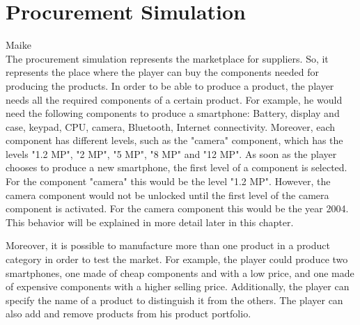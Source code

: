 \section{Procurement Simulation}
\label{procuresim}
Maike\\

The procurement simulation represents the marketplace for suppliers. So, it represents the place where the player can buy the components needed for producing the products. In order to be able to produce a product, the player needs all the required components of a certain product. For example, he would need the following components to produce a smartphone: Battery, display and case, keypad, CPU, camera, Bluetooth, Internet connectivity. Moreover, each component has different levels, such as the "camera" component, which has the levels "1.2 MP", "2 MP", "5 MP", "8 MP" and "12 MP".  As soon as the player chooses to produce a new smartphone, the first level of a component is selected. For the component "camera" this would be the level "1.2 MP". However, the camera component would not be unlocked until the first level of the camera component is activated. For the camera component this would be the year 2004. This behavior will be explained in more detail later in this chapter.

Moreover, it is possible to manufacture more than one product in a product category in order to test the market. For example, the player could produce two smartphones, one made of cheap components and with a low price, and one made of expensive components with a higher selling price. Additionally, the player can specify the name of a product to distinguish it from the others. The player can also add and remove products from his product portfolio.


